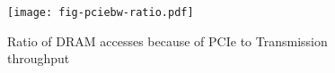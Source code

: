 \begin{figure}[H]
\texttt{[image: fig-pciebw-ratio.pdf]}
\caption{Ratio of DRAM accesses because of PCIe to Transmission throughput}
\label{fig:pciebw-ratio}
\end{figure}
